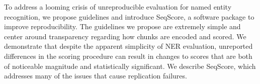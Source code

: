 To address a looming crisis of unreproducible evaluation for named entity recognition, we propose guidelines and introduce SeqScore, a software package to improve reproducibility. The guidelines we propose are extremely simple and center around transparency regarding how chunks are encoded and scored. We demonstrate that despite the apparent simplicity of NER evaluation, unreported differences in the scoring procedure can result in changes to scores that are both of noticeable magnitude and statistically significant. We describe SeqScore, which addresses many of the issues that cause replication failures.
